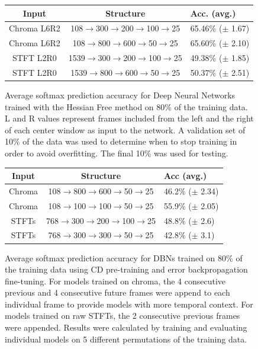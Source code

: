 \documentclass{article}
\begin{document}
\begin{figure}
  \begin{center}
\begin{tabular}{c|c|l}
Input & Structure & Acc. (avg.) \\
\hline
Chroma L6R2 & 108$\rightarrow$300$\rightarrow$200$\rightarrow$100$\rightarrow$25 & 65.46\% ($\pm$ 1.67) \\
Chroma L6R2 & 108$\rightarrow$800$\rightarrow$600$\rightarrow$50$\rightarrow$25 & 65.60\% ($\pm$ 2.10) \\
STFT L2R0 & 1539$\rightarrow$300$\rightarrow$200$\rightarrow$100$\rightarrow$25 & 49.38\% ($\pm$ 1.85) \\
STFT L2R0 & 1539$\rightarrow$800$\rightarrow$600$\rightarrow$50$\rightarrow$25 & 50.37\% ($\pm$ 2.51) \\
\end{tabular}
\end{center}
\caption{
  Average softmax prediction accuracy for Deep Neural Networks trained with the
  Hessian Free method on 80\% of the training data. L and R values represent
  frames included from the left and the right of each center window as input to
  the network. A validation set of 10\% of the data was used to determine when
  to stop training in order to avoid overfitting. The final 10\% was used for
  testing.
}

\end{figure}

\begin{figure}
  \begin{center}
\begin{tabular}{c|c|l}
Input & Structure & Acc (avg.) \\
\hline
Chroma & 108$\rightarrow$800$\rightarrow$600$\rightarrow$50$\rightarrow$25 & 46.2\% ($\pm$ 2.34) \\
Chroma & 108$\rightarrow$100$\rightarrow$100$\rightarrow$50$\rightarrow$25  & 55.9\% ($\pm$ 2.05) \\
STFTs & 768$\rightarrow$300$\rightarrow$200$\rightarrow$100$\rightarrow$25 & 48.8\% ($\pm$ 2.6) \\
STFTs & 768$\rightarrow$300$\rightarrow$300$\rightarrow$50$\rightarrow$25 & 42.8\% ($\pm$ 3.1) \\
\end{tabular}
\end{center}

\caption{Average softmax prediction accuracy for DBNs trained on 80\% of the
  training data using CD pre-training and error backpropagation fine-tuning.
  For models trained on chroma, the 4 consecutive previous and 4 consecutive
  future frames were append to each individual frame to provide models with
more temporal context.  For models trained on raw STFTs, the 2 consecutive
previous frames were appended. Results were calculated by training and
evaluating individual models on 5 different permutations of the training data.}

\end{figure}
\end{document}
